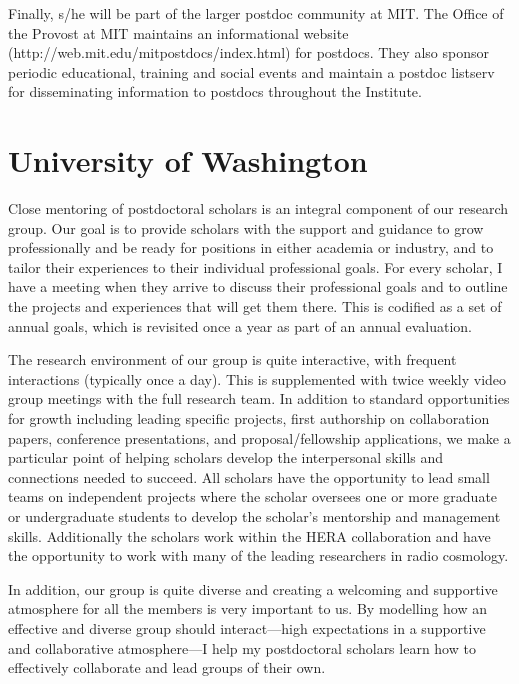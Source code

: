 \documentclass[preprint]{aastex}
\begin{document}
Finally, s/he will be part of the larger postdoc community at MIT. The Office of the
Provost at MIT maintains an informational website
(http://web.mit.edu/mitpostdocs/index.html) for postdocs. They also sponsor periodic
educational, training and social events and maintain a postdoc listserv for
disseminating information to postdocs throughout the Institute.

\section{University of Washington}
Close mentoring of postdoctoral scholars is an integral component of our research
group. Our goal is to provide scholars with the support and guidance to grow
professionally and be ready for positions in either academia or industry, and to
tailor their experiences to their individual professional goals. For every scholar, I
have a meeting when they arrive to discuss their professional goals and to outline
the projects and experiences that will get them there. This is codified as a set of
annual goals, which is revisited once a year as part of an annual evaluation.

The research environment of our group is quite interactive, with frequent interactions
(typically once a day). This is supplemented with twice weekly video group meetings
with the full research team. In addition to standard opportunities for growth
including leading specific projects, first authorship on collaboration papers,
conference presentations, and proposal/fellowship applications, we make a particular
point of helping scholars develop the interpersonal skills and connections needed to
succeed. All scholars have the opportunity to lead small teams on independent
projects where the scholar oversees one or more graduate or undergraduate students to
develop the scholar’s mentorship and management skills. Additionally the scholars
work within the HERA collaboration and have the opportunity to work with many of the
leading researchers in radio cosmology. 

In addition, our group is quite diverse and creating a welcoming and supportive
atmosphere for all the members is very important to us. By modelling how an effective
and diverse group should interact—high expectations in a supportive and collaborative
atmosphere—I help my postdoctoral scholars learn how to effectively collaborate and
lead groups of their own.
\end{document}
